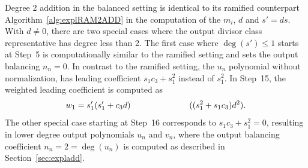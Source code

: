 Degree 2 addition in the balanced setting is identical to its ramified
counterpart Algorithm~\ref{alg:explRAM2ADD} in the computation of the $m_i$, $d$
and $s' = ds$. With $d \neq 0$, there are two special cases where the output
divisor class representative has degree less than 2. The first case where
$\deg(s') \leq 1$ starts at Step~5 is computationally similar to the ramified
setting and sets the output balancing $n_n = 0$.  In contrast to the ramified
setting, the $u_n$ polynomial without normalization, has leading coefficient
$s_1c_3 + s_1^2$ instead of $s_1^2$. In Step~15, the weighted leading
coefficient is computed as
$$ w_1 = s_1'(s_1' + c_3d) \quad\quad\quad\quad\quad\quad\quad ((s_1^2 + s_1c_3)d^2). $$ The other
special case starting at Step~16 corresponds to $s_1c_3 + s_1^2 = 0$, resulting
in lower degree output polynomials $u_n$ and $v_n$, where the output balancing
coefficient $n_n = 2 = \deg(u_n)$ is computed as described in
Section~\ref{sec:expladd}. 

